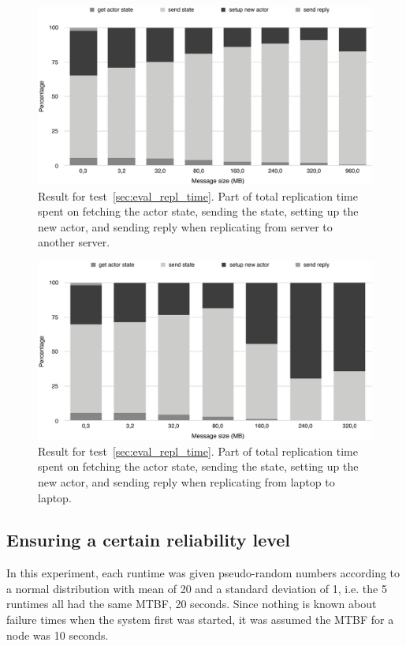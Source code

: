 \documentclass{cslthse-msc}
\begin{document}
\begin{figure}[!hbt]
\centering
\includegraphics[scale=0.5]{images/results/replication_time_percentages_server.pdf} 
\caption{Result for test~\ref{sec:eval_repl_time}. Part of total replication time spent on fetching the actor state, sending the state, setting up the new actor, and sending reply when replicating from server to another server.}\label{fig:replication_time_percentages_server}
\end{figure}

\begin{figure}[!hbt]
\centering
\includegraphics[scale=0.5]{images/results/replication_time_percentages_laptop.pdf} 
\caption{Result for test~\ref{sec:eval_repl_time}. Part of total replication time spent on fetching the actor state, sending the state, setting up the new actor, and sending reply when replicating from laptop to laptop.}\label{fig:replication_time_percentages_laptop}
\end{figure}

\subsection{Ensuring a certain reliability level} \label{sec:eval_rel_level}
In this experiment, each runtime was given pseudo-random numbers according to a normal distribution with mean of 20 and a standard deviation of 1, i.e. the 5 runtimes all had the same MTBF, 20 seconds. Since nothing is known about failure times when the system first was started, it was assumed the MTBF for a node was 10 seconds.
\end{document}
